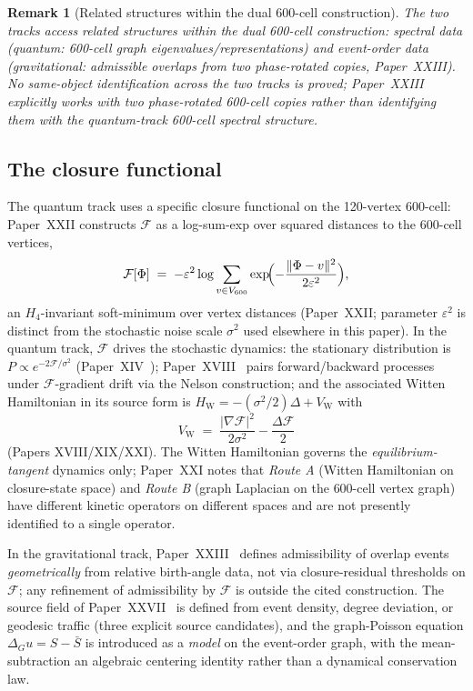 \documentclass[12pt]{article}
\newtheorem{remark}[theorem]{Remark}
\newcommand{\Fcal}{\mathcal{F}}
\newcommand{\HW}{H_{\mathrm{W}}}
\begin{document}
\begin{remark}[Related structures within the dual 600-cell construction]
The two tracks access related structures within the dual 600-cell construction: spectral data (quantum: 600-cell graph eigenvalues/representations) and event-order data (gravitational: admissible overlaps from two phase-rotated copies, Paper~XXIII). No same-object identification across the two tracks is proved; Paper~XXIII explicitly works with two phase-rotated 600-cell copies rather than identifying them with the quantum-track 600-cell spectral structure.
\end{remark}

\subsection{The closure functional}

The quantum track uses a specific closure functional on the 120-vertex 600-cell: Paper~XXII constructs $\Fcal$ as a log-sum-exp over squared distances to the 600-cell vertices,
\begin{equation}
    \Fcal[\Phi] \;=\; -\varepsilon^2 \log \sum_{v \in V_{600}} \exp\!\Bigl(-\frac{\|\Phi - v\|^2}{2\varepsilon^2}\Bigr),
\end{equation}
an $H_4$-invariant soft-minimum over vertex distances (Paper~XXII; parameter $\varepsilon^2$ is distinct from the stochastic noise scale $\sigma^2$ used elsewhere in this paper). In the quantum track, $\Fcal$ drives the stochastic dynamics: the stationary distribution is $P \propto e^{-2\Fcal/\sigma^2}$ (Paper~XIV~\citep{SmartXIV}); Paper~XVIII~\citep{SmartXVIII} pairs forward/backward processes under $\Fcal$-gradient drift via the Nelson construction; and the associated Witten Hamiltonian in its source form is $\HW = -(\sigma^2/2)\Delta + V_{\mathrm{W}}$ with
\begin{equation}
V_{\mathrm{W}} \;=\; \frac{|\nabla \Fcal|^2}{2\sigma^2} - \frac{\Delta \Fcal}{2}
\end{equation}
(Papers XVIII/XIX/XXI). The Witten Hamiltonian governs the \emph{equilibrium-tangent} dynamics only; Paper~XXI notes that \emph{Route A} (Witten Hamiltonian on closure-state space) and \emph{Route B} (graph Laplacian on the 600-cell vertex graph) have different kinetic operators on different spaces and are not presently identified to a single operator.

In the gravitational track, Paper~XXIII~\citep{SmartXXIII} defines admissibility of overlap events \emph{geometrically} from relative birth-angle data, not via closure-residual thresholds on $\Fcal$; any refinement of admissibility by $\Fcal$ is outside the cited construction. The source field of Paper~XXVII~\citep{SmartXXVII} is defined from event density, degree deviation, or geodesic traffic (three explicit source candidates), and the graph-Poisson equation $\Delta_G u = S - \bar{S}$ is introduced as a \emph{model} on the event-order graph, with the mean-subtraction an algebraic centering identity rather than a dynamical conservation law.
\end{document}
